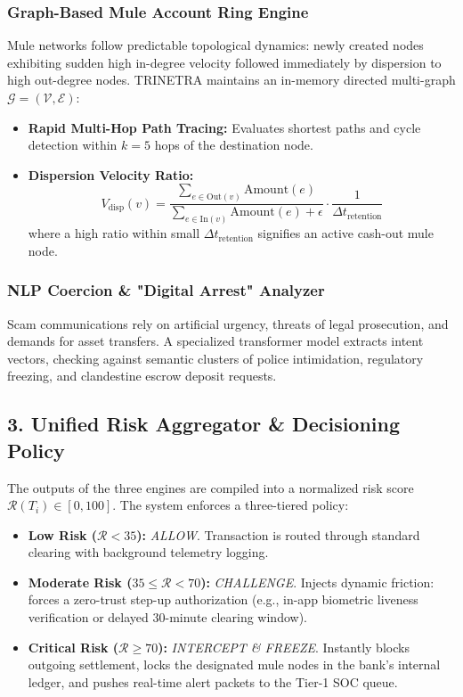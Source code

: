 \documentclass[10pt,journal,compsoc]{IEEEtran}
\begin{document}
\subsubsection{Graph-Based Mule Account Ring Engine}
Mule networks follow predictable topological dynamics: newly created nodes exhibiting sudden high in-degree velocity followed immediately by dispersion to high out-degree nodes. 
TRINETRA maintains an in-memory directed multi-graph $\mathcal{G} = (\mathcal{V}, \mathcal{E})$:
\begin{itemize}
    \item \textbf{Rapid Multi-Hop Path Tracing:} Evaluates shortest paths and cycle detection within $k=5$ hops of the destination node.
    \item \textbf{Dispersion Velocity Ratio:}
    \begin{equation}
        V_{\text{disp}}(v) = \frac{\sum_{e \in \text{Out}(v)} \text{Amount}(e)}{\sum_{e \in \text{In}(v)} \text{Amount}(e) + \epsilon} \cdot \frac{1}{\Delta t_{\text{retention}}}
    \end{equation}
    where a high ratio within small $\Delta t_{\text{retention}}$ signifies an active cash-out mule node.
\end{itemize}

\subsubsection{NLP Coercion \& "Digital Arrest" Analyzer}
Scam communications rely on artificial urgency, threats of legal prosecution, and demands for asset transfers. A specialized transformer model extracts intent vectors, checking against semantic clusters of police intimidation, regulatory freezing, and clandestine escrow deposit requests.

\subsection{3. Unified Risk Aggregator \& Decisioning Policy}
The outputs of the three engines are compiled into a normalized risk score $\mathcal{R}(T_i) \in [0, 100]$. The system enforces a three-tiered policy:
\begin{itemize}
    \item \textbf{Low Risk ($\mathcal{R} < 35$):} \textit{ALLOW}. Transaction is routed through standard clearing with background telemetry logging.
    \item \textbf{Moderate Risk ($35 \le \mathcal{R} < 70$):} \textit{CHALLENGE}. Injects dynamic friction: forces a zero-trust step-up authorization (e.g., in-app biometric liveness verification or delayed 30-minute clearing window).
    \item \textbf{Critical Risk ($\mathcal{R} \ge 70$):} \textit{INTERCEPT \& FREEZE}. Instantly blocks outgoing settlement, locks the designated mule nodes in the bank's internal ledger, and pushes real-time alert packets to the Tier-1 SOC queue.
\end{itemize}
\end{document}
